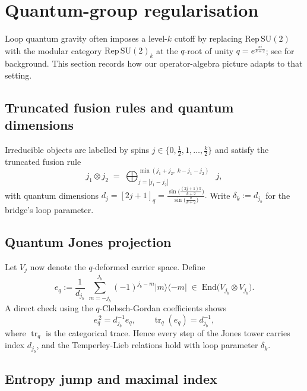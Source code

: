 \documentclass[11pt]{article}
\begin{document}
\section{Quantum-group regularisation}\label{sec:qgroup}

Loop quantum gravity often imposes a level-$k$ cutoff by replacing
$\mathrm{Rep}\,\mathrm{SU}(2)$ with the modular category
$\mathrm{Rep}\,\mathrm{SU}(2)_k$ at the $q$-root of unity
$q=e^{\frac{\pi i}{k+2}}$; see \cite{BakalovKirillov} for background. This section records how our operator-algebra
picture adapts to that setting.

\subsection{Truncated fusion rules and quantum dimensions}

Irreducible objects are labelled by spins
$j\in\{0,\tfrac12,1,\dots,\tfrac{k}{2}\}$ and satisfy the truncated fusion
rule
\[
  j_1\otimes j_2
  \;=\;
  \bigoplus_{j=|j_1-j_2|}^{\min(j_1+j_2,\;k-j_1-j_2)}
  \!\!\!\!\!\!\!\!\!\!\!\!\!\!\!\!\;\;j,
\]
with quantum dimensions
\(
  d_j=[2j+1]_q
     =\frac{\sin\!\bigl(\frac{(2j+1)\pi}{k+2}\bigr)}
            {\sin\!\bigl(\frac{\pi}{k+2}\bigr)}.
\)
Write $\delta_k:=d_{j_b}$ for the bridge's loop parameter.

\subsection{Quantum Jones projection}

Let $V_j$ now denote the $q$-deformed carrier space.
Define
\[
  e_q
  :=
  \frac{1}{d_{j_b}}\;
  \sum_{m=-j_b}^{j_b}
     (-1)^{j_b-m}
     |m\rangle\!\langle{-m}|
     \;\in\;
     \mathrm{End}\bigl(V_{j_b}\!\otimes\!V_{j_b}\bigr).
\]
A direct check using the $q$-Clebsch-Gordan coefficients shows
\[
  e_q^{\,2}=d_{j_b}^{-1}e_q,
  \qquad
  \operatorname{tr}_q(e_q)=d_{j_b}^{-1},
\]
where $\operatorname{tr}_q$ is the categorical trace.  Hence every step of
the Jones tower carries index $d_{j_b}$, and the Temperley-Lieb relations
hold with loop parameter $\delta_k$.

\subsection{Entropy jump and maximal index}
\end{document}
